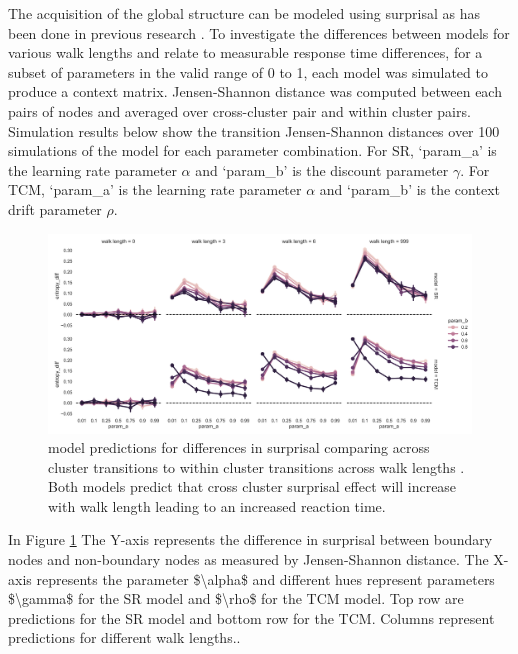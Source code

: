 The acquisition of the global structure can be modeled using surprisal as has been done in previous research \parencite{lynn2020abstract,lynn2020humans,lynn2020human}. To investigate the differences between models for various walk lengths and relate to measurable response time differences,  for a subset of parameters in the valid range of 0 to 1, each model was simulated to produce a context matrix. Jensen-Shannon distance was computed between each pairs of nodes and averaged over cross-cluster pair and within cluster pairs. Simulation results below show the transition Jensen-Shannon distances over 100 simulations of the model for each parameter combination. For SR, `param\_a' is the learning rate parameter $\alpha$ and `param\_b' is the discount parameter $\gamma$. For TCM, `param\_a' is the learning rate parameter $\alpha$ and `param\_b' is the context drift parameter $\rho$. 
\begin{figure}
	\centering
	\includegraphics[width = \textwidth]{chapter_notebooks/chapter_2/figures/SR_TCM_boundary_nonboundary_jsdist.png}
	\caption{ model predictions for differences in surprisal comparing across cluster transitions to within cluster transitions across walk lengths . Both models predict that cross cluster surprisal effect will increase with walk length leading to an increased reaction time.}
	\label{fig:SR-TCM-walklength-transition-sjdist}
\end{figure}

In Figure \ref{fig:SR-TCM-walklength-transition-sjdist} \ac{The Y-axis represents the difference in surprisal between boundary nodes and non-boundary nodes as measured by Jensen-Shannon distance. The X-axis represents the parameter $\alpha$ and different hues represent parameters $\gamma$ for the SR model and $\rho$ for the TCM model. Top row are predictions for the SR model and bottom row for the TCM. Columns represent predictions for different walk lengths.}. 

